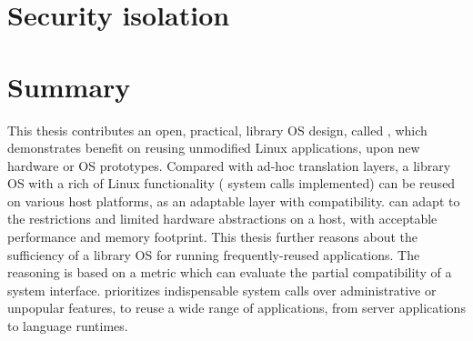 \section{Security isolation}
\label{sec:intro:security}

\placeholder{}




\section{Summary}

This thesis contributes an open, practical, library OS design, called \graphene{},
which demonstrates benefit on reusing unmodified Linux applications, upon new hardware or OS prototypes.
Compared with ad-hoc translation layers,
a library OS with a rich of Linux functionality (\graphenesyscalls{} system calls implemented) can be reused on various host platforms, as an adaptable layer with compatibility.
\graphene{} can adapt to the restrictions and
limited hardware abstractions on a host, with acceptable performance and memory footprint.
This thesis further reasons about the sufficiency of a library OS
for running frequently-reused applications. The reasoning is based on a metric which can evaluate the partial compatibility of a system interface.
\graphene{} prioritizes indispensable system calls over administrative or unpopular features,
to reuse a wide range of applications, from server applications to language runtimes.


